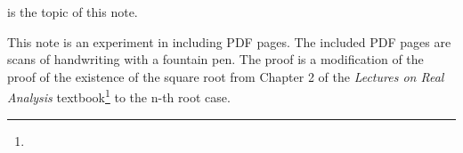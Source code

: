  is the topic of this note.

This note is an experiment in including PDF pages. The included PDF pages are scans of handwriting with a fountain pen. The proof is a modification of the proof of the existence of the square root from Chapter 2 of the \textit{Lectures on Real Analysis} textbook\footnote{} to the n-th root case.



